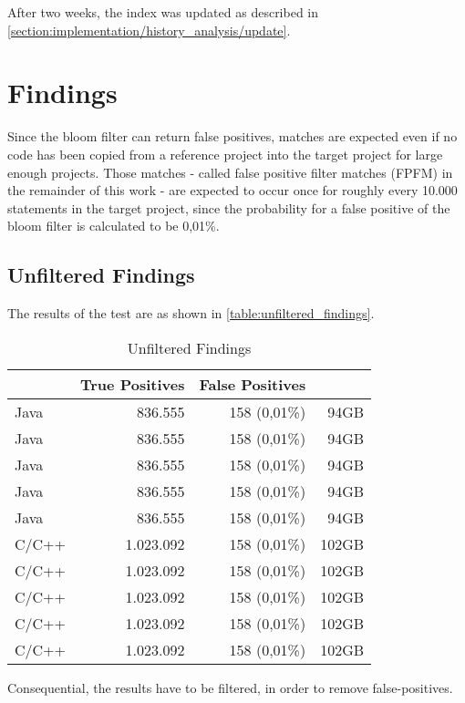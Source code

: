 After two weeks, the index was updated as described in \ref{section:implementation/history_analysis/update}.


\section{Findings}
Since the bloom filter can return false positives, matches are expected even if no code has been copied from a reference project into the target project for large enough projects.
Those matches - called false positive filter matches (FPFM) in the remainder of this work - are expected to occur once for roughly every 10.000 statements in the target project, since the probability for a false positive of the bloom filter is calculated to be 0,01\%.

\subsection{Unfiltered Findings}
The results of the test are as shown in \autoref{table:unfiltered_findings}.

\begin{table}[ht]
	\centering
	\begin{tabular}{l|rrr}
		& \textbf{True Positives} & \textbf{False Positives} & \textbf{} \\ 
		\hline 
		Java & 836.555 & 158 (0,01\%) & 94GB \\ 
		Java & 836.555 & 158 (0,01\%) & 94GB \\ 
		Java & 836.555 & 158 (0,01\%) & 94GB \\ 
		Java & 836.555 & 158 (0,01\%) & 94GB \\ 
		Java & 836.555 & 158 (0,01\%) & 94GB \\ 
		\hline
		C/C++ & 1.023.092 & 158 (0,01\%) & 102GB \\ 
		C/C++ & 1.023.092 & 158 (0,01\%) & 102GB \\ 
		C/C++ & 1.023.092 & 158 (0,01\%) & 102GB \\ 
		C/C++ & 1.023.092 & 158 (0,01\%) & 102GB \\ 
		C/C++ & 1.023.092 & 158 (0,01\%) & 102GB \\ 
	\end{tabular}
	\caption{Unfiltered Findings}\label{table:unfiltered_findings}
\end{table} 

Consequential, the results have to be filtered, in order to remove false-positives.

